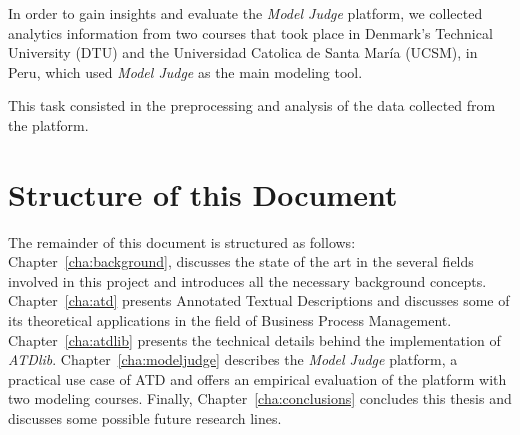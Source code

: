 In order to gain insights and evaluate the \emph{Model Judge} platform, we
collected analytics information from two courses that took place in
Denmark's Technical University (DTU) and the Universidad Catolica de Santa
Mar\'ia (UCSM), in Peru, which used \emph{Model Judge} as the main
modeling tool.

This task consisted in the preprocessing and analysis of the data collected from
the platform.





\section{Structure of this Document}

The remainder of this document is structured as follows:
Chapter~\ref{cha:background}, discusses the state of the art in the several
fields involved in this project and introduces all the necessary background
concepts. Chapter~\ref{cha:atd} presents Annotated Textual Descriptions and
discusses some of its theoretical applications in the field of Business Process
Management. Chapter~\ref{cha:atdlib} presents the technical details behind the
implementation of \emph{ATDlib}. Chapter~\ref{cha:modeljudge} describes the
\emph{Model Judge} platform, a practical use case of ATD and offers an empirical
evaluation of the platform with two modeling courses. Finally,
Chapter~\ref{cha:conclusions} concludes this thesis and discusses some possible
future research lines.
